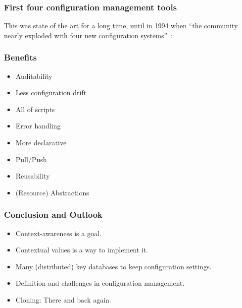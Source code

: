 \begin{frame}
	\frametitle{First four configuration management tools}
	This was state of the art for a long time, until in 1994 when \enquote{the community nearly exploded with four new configuration systems}~\cite{evard1997analysis}:

\end{frame}

\begin{frame}
	\frametitle{Benefits}

	\begin{itemize}
	\item Auditability
	\item Less configuration drift
	\item All of scripts
	\item Error handling
	\item More declarative
	\item Pull/Push
	\item Reusability
	\item (Resource) Abstractions
	\end{itemize}
\end{frame}


\begin{frame}
	\frametitle{Conclusion and Outlook}

	\begin{itemize}
	\item Context-awareness is a goal.
	\item Contextual values is a way to implement it.
	\item Many (distributed) key databases to keep configuration settings.
	\item Definition and challenges in configuration management.
	\item Cloning: There and back again.
	\end{itemize}
\end{frame}






\nocite{raab2017introducing}

\appendix

\begin{frame}[allowframebreaks]
	
	
\end{frame}




